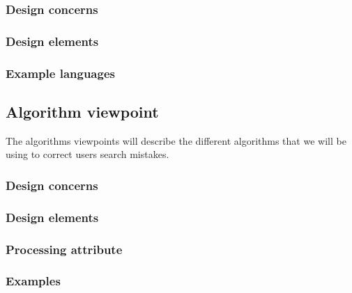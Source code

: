 \documentclass[journal,compsoc, 10pt, draftclsnofoot, onecolumn]{IEEEtran}
\begin{document}
\subsubsection*{Design concerns}

\subsubsection*{Design elements}

\subsubsection*{Example languages}

\subsection{Algorithm viewpoint}
The algorithms viewpoints will describe the different algorithms that we will be
 using to correct users search mistakes.

\subsubsection*{Design concerns}

\subsubsection*{Design elements}

\subsubsection*{Processing attribute}

\subsubsection*{Examples}
\end{document}
